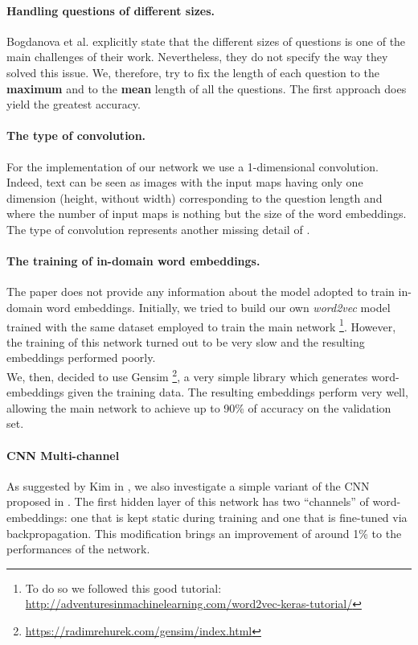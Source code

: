 \documentclass[10pt,twocolumn,letterpaper]{article}
\begin{document}
    \paragraph{Handling questions of different sizes.}
    Bogdanova et al. explicitly state that the different sizes of questions is one of the main challenges of their work. Nevertheless, they do not specify the way they solved this issue. We, therefore, try to fix the length of each question to the \textbf{maximum} and to the \textbf{mean} length of all the questions. The first approach does yield the greatest accuracy.
    \paragraph{The type of convolution.}
    For the implementation of our network we use a 1-dimensional convolution. Indeed, text can be seen as images with the input maps having only one dimension (height, without width) corresponding to the question length and where the number of input maps is nothing but the size of the word embeddings. The type of convolution represents another missing detail of \cite{bogdanova2015detecting}.    
    \paragraph{The training of in-domain word embeddings.}
    The paper does not provide any information about the model adopted to train in-domain word embeddings. Initially, we tried to build our own \emph{word2vec} model \cite{mikolov2013distributed} trained with the same dataset employed to train the main network \footnote{To do so we followed this good tutorial: \url{http://adventuresinmachinelearning.com/word2vec-keras-tutorial/}}. However, the training of this network turned out to be very slow and the resulting embeddings performed poorly. \\
    We, then, decided to use Gensim \footnote{\url{https://radimrehurek.com/gensim/index.html}}, a very simple library which generates word-embeddings given the training data. The resulting embeddings perform very well, allowing the main network to achieve up to 90\% of accuracy on the validation set.
    	\paragraph{CNN Multi-channel}
    	As suggested by Kim in \cite{kim2014convolutional}, we also investigate a simple variant of the CNN proposed in \cite{bogdanova2015detecting}. The first hidden layer of this network has two ``channels'' of word-embeddings: one that is kept static during training and one that is fine-tuned via backpropagation. This modification brings an improvement of around 1\% to the performances of the network.  
\end{document}
